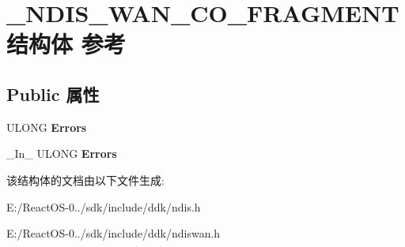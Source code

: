 \hypertarget{struct___n_d_i_s___w_a_n___c_o___f_r_a_g_m_e_n_t}{}\section{\+\_\+\+N\+D\+I\+S\+\_\+\+W\+A\+N\+\_\+\+C\+O\+\_\+\+F\+R\+A\+G\+M\+E\+N\+T结构体 参考}
\label{struct___n_d_i_s___w_a_n___c_o___f_r_a_g_m_e_n_t}
\subsection*{Public 属性}
\begin{DoxyCompactItemize}
\item 
\mbox{\label{struct___n_d_i_s___w_a_n___c_o___f_r_a_g_m_e_n_t_a029f3de84f839f8ac96e343694022f6c}} 
U\+L\+O\+NG {\bfseries Errors}
\item 
\mbox{\label{struct___n_d_i_s___w_a_n___c_o___f_r_a_g_m_e_n_t_a1c6ae154f03bce7423d996202407714a}} 
\+\_\+\+In\+\_\+ U\+L\+O\+NG {\bfseries Errors}
\end{DoxyCompactItemize}


该结构体的文档由以下文件生成\+:\begin{DoxyCompactItemize}
\item 
E\+:/\+React\+O\+S-\/0../sdk/include/ddk/ndis.\+h\item 
E\+:/\+React\+O\+S-\/0../sdk/include/ddk/ndiswan.\+h\end{DoxyCompactItemize}
